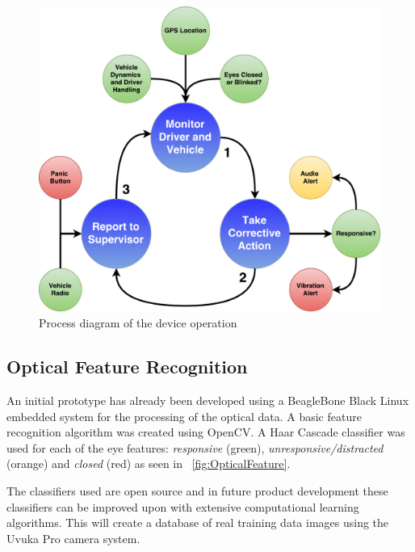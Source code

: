 \begin{figure}[H]
\centering
\includegraphics[width=1\textwidth]{images/NVP_Poster_Flowchart.pdf}
\vskip10pt
\caption[Device Operation Activity Diagram]{Process diagram of the device operation}
\label{fig:DeviceFlowChart}
\end{figure}


\subsection{Optical Feature Recognition}

An initial prototype has already been developed using a BeagleBone Black Linux embedded system for the processing of the optical data. A basic feature recognition algorithm was created using OpenCV. A Haar Cascade classifier was used for each of the eye features: \textit{responsive} (green), \textit{unresponsive/distracted} (orange) and \textit{closed} (red) as seen in ~\cref{fig:OpticalFeature}. 

The classifiers used are open source and in future product development these classifiers can be improved upon with extensive computational learning algorithms. This will create a database of real training data images using the Uvuka Pro camera system.

